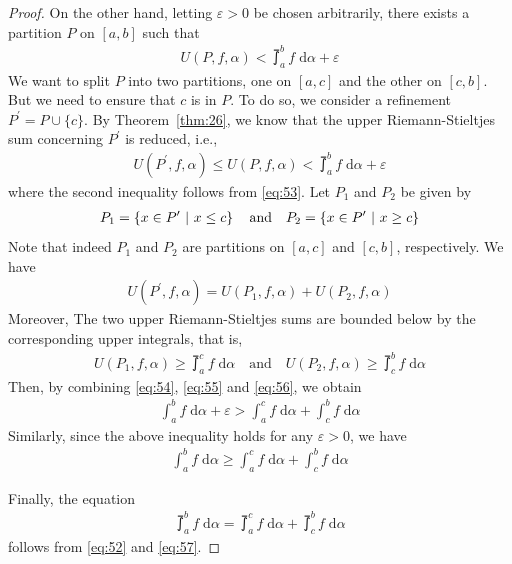 \documentclass[thmcnt=section, 12pt]{my-elegantbook}
\begin{document}
\begin{proof}
    On the other hand, letting $\varepsilon > 0$ be chosen arbitrarily, there exists a partition $P$ on $[a, b]$ such that 
    \begin{align}
        U(P,f,\alpha) < \upint_a^b f \; \mathrm{d}\alpha + \varepsilon
        \label{eq:53}
    \end{align}
    We want to split $P$ into two partitions, one on $[a,c]$ and the other on $[c, b]$. But we need to ensure that $c$ is in $P$. To do so, we consider a refinement $P^\prime = P \cup \{c\}$. By Theorem~\ref{thm:26}, we know that the upper Riemann-Stieltjes sum concerning $P^\prime$ is reduced, i.e., 
    \begin{align}
        U(P^\prime,f,\alpha) \leq U(P,f,\alpha) < \upint_a^b f \; \mathrm{d}\alpha + \varepsilon
        \label{eq:54}
    \end{align}
    where the second inequality follows from \eqref{eq:53}. Let $P_1$ and $P_2$ be given by 
    \begin{align*}
        P_1 = \left\{ x \in P^\prime \ \middle| \ x \leq c \right\}
        \quad \text{and} \quad 
        P_2 = \left\{ x \in P^\prime \ \middle| \ x \geq c \right\}
    \end{align*}
    Note that indeed $P_1$ and $P_2$ are partitions on $[a, c]$ and $[c, b]$, respectively. We have 
    \begin{align}
        U(P^\prime,f,\alpha) = U(P_1,f,\alpha) + U(P_2,f,\alpha)
        \label{eq:55}
    \end{align}
    Moreover, The two upper Riemann-Stieltjes sums are bounded below by the corresponding upper integrals, that is, 
    \begin{align}
        U(P_1,f,\alpha) \geq \upint_a^c f \; \mathrm{d}\alpha
        \quad\text{and}\quad 
        U(P_2,f,\alpha) \geq \upint_c^b f \; \mathrm{d}\alpha
        \label{eq:56}
    \end{align}
    Then, by combining \eqref{eq:54}, \eqref{eq:55} and \eqref{eq:56}, we obtain
    \begin{align*}
        \int_a^b f \; \mathrm{d}\alpha + \varepsilon
        > \int_a^c f \; \mathrm{d}\alpha
        + \int_c^b f \; \mathrm{d}\alpha
    \end{align*}
    Similarly, since the above inequality holds for any $\varepsilon > 0$, we have 
    \begin{align}
        \int_a^b f \; \mathrm{d}\alpha
        \geq \int_a^c f \; \mathrm{d}\alpha
        + \int_c^b f \; \mathrm{d}\alpha
        \label{eq:57}
    \end{align}

    Finally, the equation 
    \begin{align*}
        \upint_a^b f \; \mathrm{d}\alpha = \upint_a^c f \; \mathrm{d}\alpha + \upint_c^b f \; \mathrm{d}\alpha
    \end{align*}
    follows from \eqref{eq:52} and \eqref{eq:57}.
\end{proof}
\end{document}
